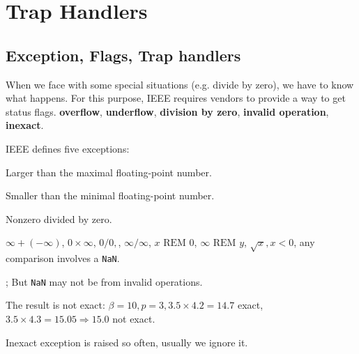 \section{Trap Handlers}

\subsection{Exception, Flags, Trap handlers}

When we face with some special situations (e.g. divide by zero), we have to know what happens. For this purpose, IEEE requires vendors to provide a way to get status flags.  \textbf{overflow}, \textbf{underflow}, \textbf{division by zero}, \textbf{invalid operation}, \textbf{inexact}.

\begin{definition*}
    IEEE defines five exceptions:
    \begin{definition}[Overflow]
        Larger than the maximal floating-point number.
    \end{definition}
    \begin{definition}[Underflow]
        Smaller than the minimal floating-point number.
    \end{definition}
    \begin{definition}
        Nonzero divided by zero.
    \end{definition}
    \begin{definition}
        $\infty +(- \infty)$, $0 \times \infty$, $0/0,$, $\infty/\infty$, $x \mbox{ REM } 0$, $\infty \mbox{ REM } y$, $\sqrt{x}, x < 0$, any comparison involves a \texttt{NaN}.

        \begin{remark}
            ; But \texttt{NaN} may not be from invalid operations.
        \end{remark}
    \end{definition}
    \begin{definition}[Inexact]
        The result is not exact: $\beta = 10, p = 3, 3.5 \times 4.2 = 14.7$ exact, $3.5 \times 4.3 = 15.05 \Rightarrow 15.0$ not exact.
        \begin{remark}
            Inexact exception is raised so often, usually we ignore it.
        \end{remark}
    \end{definition}
\end{definition*}

